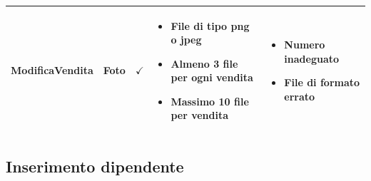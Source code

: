 \documentclass[12pt]{article}
\begin{document}
\begin{longtable}{|l|l|l|l|l|}
 \textbf{ModificaVendita} & Foto & $\checkmark$ & \begin{minipage}{3.5cm}
 \vspace{5pt}
 \begin{itemize}
 \item File di tipo png o jpeg
 \item Almeno 3 file per ogni vendita
 \item Massimo 10 file per vendita
 \end{itemize}
 \vspace{5pt}
 \end{minipage} & \begin{minipage}{4cm}
 \vspace{5pt}
 \begin{itemize}
 \item Numero inadeguato
 \item File di formato errato
 \end{itemize}
 \vspace{5pt}
 \end{minipage} \\ \hline
 
 \end{longtable}
 
 \newpage
 \subsection{Inserimento dipendente}
 
\end{document}
